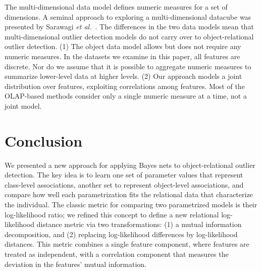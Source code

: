 \documentclass[conference]{IEEEtran}
\begin{document}
The multi-dimensional data model defines numeric measures for a set of dimensions. A seminal approach to exploring a multi-dimensional datacube was presented by Sarawagi {\em et al.}~\cite{Sarawagi1998}. 
The differences in the two data models mean that multi-dimensional outlier detection models do not carry over to object-relational outlier detection. (1) The object data model allows but does not require any numeric measures. In the datasets we examine in this paper, all features are discrete. Nor do we assume that it is possible to aggregate numeric measures to summarize lower-level data at higher levels.  
(2) Our approach models a joint distribution over features, exploiting correlations among features. Most of the OLAP-based methods consider only a single numeric measure at a time, not a joint model. 
								
								
\section{Conclusion} We presented a new approach for applying Bayes nets to object-relational outlier detection. The key idea is to learn one set of parameter values that represent class-level associations, another set to represent object-level associations, and compare how well each parametrization fits the relational data that characterize the individual. The classic metric for comparing two parametrized models is their log-likelihood ratio; we refined this concept to define  a new relational log-likelihood distance metric via two transformations:  (1) a mutual information decomposition, and (2) replacing log-likelihood differences by log-likelihood distances. This metric combines a single feature component, where features are treated as independent, with a correlation component that measures the deviation in the features' mutual information.
\end{document}
